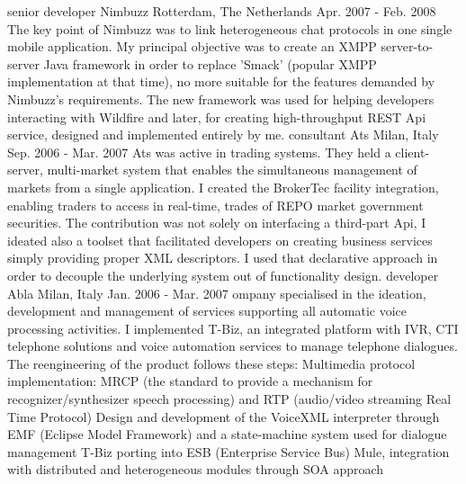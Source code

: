 \begin{cventries}
\cventry
  {senior developer} %
  {Nimbuzz} %
  {Rotterdam, The Netherlands} %
  {Apr. 2007 - Feb. 2008} %
  {
    The key point of Nimbuzz was to link heterogeneous chat protocols in one single mobile application.
    My principal objective was to create an XMPP server-to-server Java framework in order to replace 'Smack' (popular XMPP implementation at that time),
    no more suitable for the features demanded by Nimbuzz's requirements. The new framework was used for helping developers interacting with Wildfire and later,
    for creating high-throughput REST Api service, designed and implemented entirely by me.
  }
\cventry
  {consultant} %
  {Ats} %
  {Milan, Italy} %
  {Sep. 2006 - Mar. 2007} %
  {
    Ats was active in trading systems. They held a client-server, multi-market system that enables the simultaneous management of markets from a single application.
    I created the BrokerTec facility integration, enabling traders to access in real-time, trades of REPO market government securities.
    The contribution was not solely on interfacing a third-part Api, I ideated also a toolset that facilitated developers on creating business services
    simply providing proper XML descriptors. I used that declarative approach in order to decouple the underlying system out of functionality design.
  }
\cventry
  {developer} %
  {Abla} %
  {Milan, Italy} %
  {Jan. 2006 - Mar. 2007} %
  {
  ompany specialised in the ideation, development and management of services supporting all automatic voice processing activities.
  I implemented T-Biz, an integrated platform with IVR, CTI telephone solutions and voice automation services to manage telephone dialogues.
  The reengineering of the product follows these steps:
Multimedia protocol implementation: MRCP (the standard to provide a mechanism for recognizer/synthesizer speech processing) and RTP (audio/video streaming Real Time Protocol)
Design and development of the VoiceXML interpreter through EMF (Eclipse Model Framework) and a state-machine system used for dialogue management
T-Biz porting into ESB (Enterprise Service Bus) Mule, integration with distributed and heterogeneous modules through SOA approach
  }
\end{cventries}
